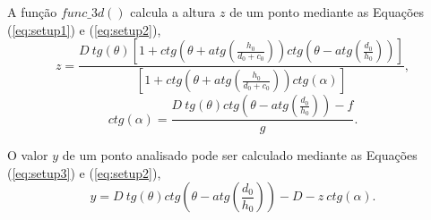 \documentclass[12pt]{article}
\begin{document}
A função $func\_3d()$ calcula a altura $z$ de um ponto mediante as
Equações (\ref{eq:setup1}) e (\ref{eq:setup2}),
\begin{equation}\label{eq:setup1}
z=\frac{
D~tg(\theta)
\left[
1+ ctg\left(\theta+atg\left(\frac{h_0}{d_0+c_0}\right)\right) ctg\left(\theta-atg\left(\frac{d_0}{h_0}\right)\right) 
\right]
}{
\left[1+ctg\left(\theta+atg\left(\frac{h_0}{d_0+c_0}\right)\right) ctg(\alpha)\right]
},
\end{equation}
\begin{equation}\label{eq:setup2}
ctg(\alpha)=\frac{D~tg(\theta)ctg\left(\theta-atg\left(\frac{d_0}{h_0}\right)\right)- f}{g}.
\end{equation}

O valor $y$ de um ponto analisado pode ser calculado mediante as
Equações (\ref{eq:setup3}) e (\ref{eq:setup2}),
\begin{equation}\label{eq:setup3}
y=D~tg(\theta)ctg\left(\theta-atg\left(\frac{d_0}{h_0}\right)\right)-D-z~ctg(\alpha).
\end{equation}
\end{document}
